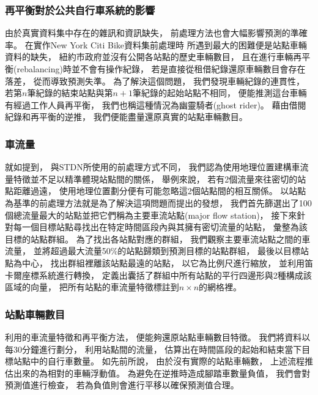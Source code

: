 \documentclass[a4paper,12pt]{extarticle}
\begin{document}
            \subsubsection{再平衡對於公共自行車系統的影響}
                \label{subsubsec:rebal}
                由於真實資料集中存在的雜訊和資訊缺失，
                前處理方法也會大幅影響預測的準確率。
                在實作New York Citi Bike資料集前處理時
                所遇到最大的困難便是站點車輛資料的缺失，
                紐約市政府並沒有公開各站點的歷史車輛數目，
                且在進行車輛再平衡(rebalancing)時並不會有操作紀錄，
                若是直接從租借紀錄還原車輛數目會存在落差，
                從而導致預測失準。
                為了解決這個問題，
                我們發現車輛紀錄的連貫性，
                若第$n$筆紀錄的結束站點與第$n + 1$筆紀錄的起始站點不相同，
                便能推測這台車輛有經過工作人員再平衡，
                我們也稱這種情況為幽靈騎者(ghost rider)。
                藉由借閱紀錄和再平衡的逆推，
                我們便能盡量還原真實的站點車輛數目。

            \subsubsection{車流量}
                \label{subsubsec:flow}
                就如提到，
                與STDN所使用的前處理方式不同，
                我們認為使用地理位置建構車流量特徵並不足以精準體現站點間的關係，
                舉例來說，
                若有2個流量來往密切的站點距離過遠，
                使用地理位置劃分便有可能忽略這2個站點間的相互關係。
                以站點為基準的前處理方法就是為了解決這項問題而提出的發想，
                我們首先篩選出了100個總流量最大的站點並把它們稱為主要車流站點(major flow station)，
                接下來針對每一個目標站點尋找出在特定時間區段內與其擁有密切流量的站點，
                彙整為該目標的站點群組。
                為了找出各站點對應的群組，
                我們觀察主要車流站點之間的車流量，
                並將超過最大流量50\%的站點歸類到預測目標的站點群組，
                最後以目標站點為中心，
                找出群組裡離該站點最遠的站點，
                以它為比例尺進行縮放，
                並利用笛卡爾座標系統進行轉換，
                定義出囊括了群組中所有站點的平行四邊形與2種構成該區域的向量，
                把所有站點的車流量特徵標註到$n \times n$的網格裡。

            \subsubsection{站點車輛數目}
                利用的車流量特徵和再平衡方法，
                便能夠還原站點車輛數目特徵。
                我們將資料以每30分鐘進行劃分，
                利用站點間的流量，
                估算出在時間區段的起始和結束當下目標站點中的自行車數量。
                如先前所說，
                由於沒有實際的站點車輛數，
                上述流程推估出來的為相對的車輛浮動值。
                為避免在逆推時造成腳踏車數量負值，
                我們會對預測值進行檢查，
                若為負值則會進行平移以確保預測值合理。
\end{document}
